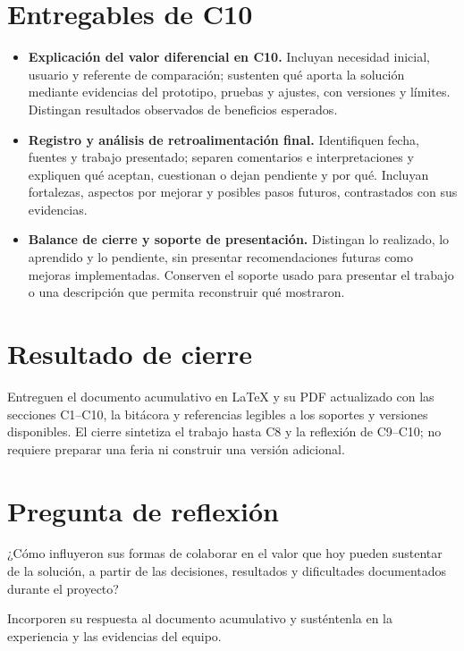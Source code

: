\section*{Entregables de C10}
\begin{itemize}
\item \textbf{Explicación del valor diferencial en C10.} Incluyan necesidad inicial, usuario y referente de comparación; sustenten qué aporta la solución mediante evidencias del prototipo, pruebas y ajustes, con versiones y límites. Distingan resultados observados de beneficios esperados.
\item \textbf{Registro y análisis de retroalimentación final.} Identifiquen fecha, fuentes y trabajo presentado; separen comentarios e interpretaciones y expliquen qué aceptan, cuestionan o dejan pendiente y por qué. Incluyan fortalezas, aspectos por mejorar y posibles pasos futuros, contrastados con sus evidencias.
\item \textbf{Balance de cierre y soporte de presentación.} Distingan lo realizado, lo aprendido y lo pendiente, sin presentar recomendaciones futuras como mejoras implementadas. Conserven el soporte usado para presentar el trabajo o una descripción que permita reconstruir qué mostraron.
\end{itemize}

\section*{Resultado de cierre}
Entreguen el documento acumulativo en LaTeX y su PDF actualizado con las secciones C1--C10, la bitácora y referencias legibles a los soportes y versiones disponibles. El cierre sintetiza el trabajo hasta C8 y la reflexión de C9--C10; no requiere preparar una feria ni construir una versión adicional.

\section*{Pregunta de reflexión}
¿Cómo influyeron sus formas de colaborar en el valor que hoy pueden sustentar de la solución, a partir de las decisiones, resultados y dificultades documentados durante el proyecto?

Incorporen su respuesta al documento acumulativo y susténtenla en la experiencia y las evidencias del equipo.


